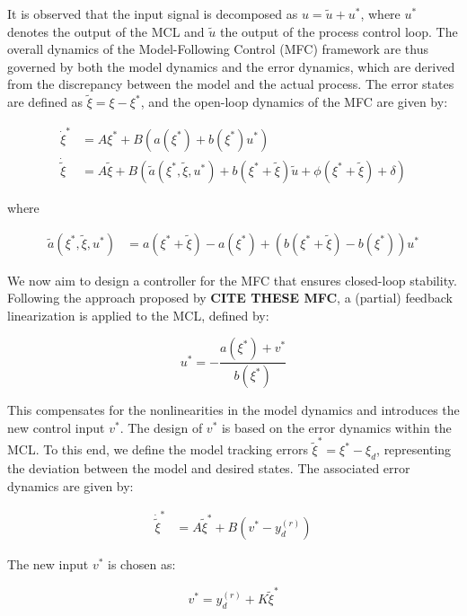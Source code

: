 It is observed that the input signal is decomposed as \(u = \tilde{u} + u^*\), where \(u^*\) denotes the output of the MCL and \(\tilde{u}\) the output of the process control loop. The overall dynamics of the Model-Following Control (MFC) framework are thus governed by both the model dynamics and the error dynamics, which are derived from the discrepancy between the model and the actual process. The error states are defined as \(\tilde{\xi} = \xi - \xi^*\), and the open-loop dynamics of the MFC are given by:

\begin{align}
\dot{\xi}^* &= A\xi^* + B \left( a(\xi^*) + b(\xi^*) u^* \right) \\
\dot{\tilde{\xi}} &= A\tilde{\xi} + B \left( \tilde{a}(\xi^*, \tilde{\xi}, u^*) + b(\xi^* + \tilde{\xi}) \tilde{u} + \phi(\xi^* + \tilde{\xi}) + \delta \right)
\end{align}

where

\begin{align}
\tilde{a}(\xi^*, \tilde{\xi}, u^*) &= a(\xi^* + \tilde{\xi}) - a(\xi^*) + \left( b(\xi^* + \tilde{\xi}) - b(\xi^*) \right) u^*
\end{align}

We now aim to design a controller for the MFC that ensures closed-loop stability. Following the approach proposed by \textbf{CITE THESE MFC}, a (partial) feedback linearization is applied to the MCL, defined by:

\begin{equation}
\label{eq:MCL_control_law}
u^* = -\frac{a(\xi^*) + v^*}{b(\xi^*)}
\end{equation}

This compensates for the nonlinearities in the model dynamics and introduces the new control input \(v^*\). The design of \(v^*\) is based on the error dynamics within the MCL. To this end, we define the model tracking errors \(\tilde{\xi}^* = \xi^* - \xi_d\), representing the deviation between the model and desired states. The associated error dynamics are given by:

\begin{align}
\dot{\tilde{\xi}}^* &= A\tilde{\xi}^* + B(v^* - y_d^{(r)})
\end{align}

The new input \(v^*\) is chosen as:

\begin{equation}
v^* = y_d^{(r)} + K\tilde{\xi}^*
\end{equation}

